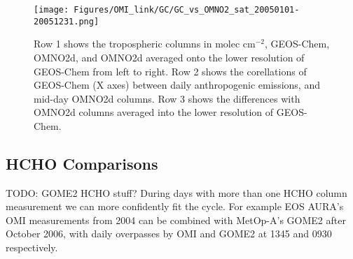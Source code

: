     \begin{figure}[!htbp]
      \texttt{[image: Figures/OMI\_link/GC/GC\_vs\_OMNO2\_sat\_20050101-20051231.png]}
      \caption{%
        Row 1 shows the tropospheric columns in molec cm$^{-2}$, GEOS-Chem, OMNO2d, and OMNO2d averaged onto the lower resolution of GEOS-Chem from left to right.
        Row 2 shows the corellations of GEOS-Chem (X axes) between daily anthropogenic emissions, and mid-day OMNO2d columns.
        Row 3 shows the differences with OMNO2d columns averaged into the lower resolution of GEOS-Chem.
      }
      \label{Model:Analysis:NOx:fig_GC_vs_OMNO2d_2005}
    \end{figure}
    
  \subsection{HCHO Comparisons}
    TODO: GOME2 HCHO stuff?
    During days with more than one HCHO column measurement we can more confidently fit the cycle. 
    For example EOS AURA's OMI measurements from 2004 can be combined with MetOp-A's GOME2 after October 2006, with daily overpasses by OMI and GOME2 at 1345 and 0930 respectively.